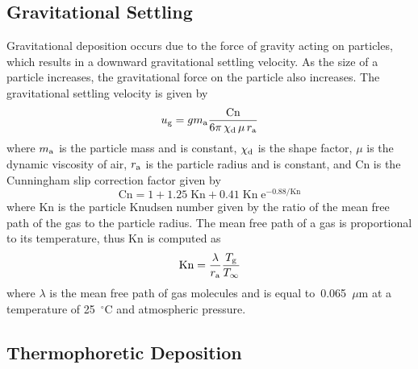 \subsection{Gravitational Settling}
\label{sec:gravitational_settling}

Gravitational deposition occurs due to the force of gravity acting on particles, which results in a downward gravitational settling velocity. As the size of a particle increases, the gravitational force on the particle also increases. The gravitational settling velocity is given by~\cite{Davies_Charles}
\begin{equation}
u\sb{g} = g m\sb{a} \frac{\textrm{Cn}}{6 \pi \, \chi\sb{d} \, \mu \, r\sb{a}}
\end{equation}
where $m\sb{a}$ is the particle mass and is constant, $\chi\sb{d}$ is the shape factor, $\mu$ is the dynamic viscosity of air, $r\sb{a}$ is the particle radius and is constant, and Cn is the Cunningham slip correction factor given by~\cite{Cunningham:1}
\begin{equation}
\textrm{Cn} = 1 + 1.25 \; \textrm{Kn} + 0.41 \; \textrm{Kn} \; \mathrm{e}^{-0.88/\textrm{Kn}}
\label{eq:Cn}
\end{equation}
where Kn is the particle Knudsen number given by the ratio of the mean free path of the gas to the particle radius. The mean free path of a gas is proportional to its temperature, thus Kn is computed as~\cite{Sippola:1}
\begin{equation}
\textrm{Kn} = \frac{\lambda}{r\sb{a}} \frac{T\sb{g}}{T_\infty}
\end{equation}
where $\lambda$ is the mean free path of gas molecules and is equal to~0.065~$\mu$m at a temperature of 25~$^\circ$C and atmospheric pressure.

\subsection{Thermophoretic Deposition}
\label{sec:thermophoretic_deposition}

